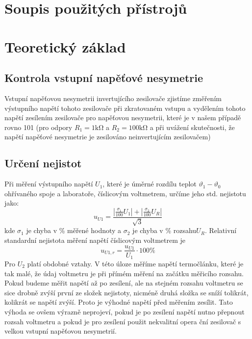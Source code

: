 \documentclass{article}
\begin{document}
\section{Soupis použitých přístrojů}



\section{Teoretický základ}
\subsection{Kontrola vstupní napěťové nesymetrie}
Vstupní napěťovou nesymetrii invertujícího zesilovače zjistíme změřením výstupního napětí tohoto zesilovače při zkratovaném vstupu a vydělením tohoto napětí zesílením zesilovače pro napěťovou nesymetrii, které je v našem případě rovno 101 (pro odpory $R_1 = 1 \si{\kilo\ohm}$ a $R_2 = 100 \si{\kilo\ohm}$ a při uvážení skutečnosti, že napětí napěťové nesymetrie je zesilováno neinvertujícím zesilovačem)

\subsection{Určení nejistot}
Při měření výstupního napětí $U_1$, které je úměrné rozdílu teplot $\vartheta_1 - \vartheta_0$ ohřívaného spoje a laboratoře, číslicovým voltmetrem, určíme jeho std. nejistotu jako:
\begin{equation}
    u_{U1}=\frac{	| \frac{\sigma_1}{100}U_1 | + | \frac{\sigma_2}{100}U_R | }{\sqrt{3}}
\end{equation}
kde $\sigma_1$ je chyba v \% měřené hodnoty a $\sigma_2$ je chyba v \% rozsahu$U_R$. Relativní standardní nejistota měření napětí číslicovým voltmetrem je
\begin{equation}
    u_{U1,r} = \frac{u_{U1}}{U_1} \cdot 100\%
\end{equation}
Pro $U_2$ platí obdobné vztahy. V této úloze měříme napětí termočlánku, které je tak malé, že údaj voltmetru je při přímém měření na začátku měřicího rozsahu. Pokud budeme měřit napětí až po zesílení, ale na stejném rozsahu voltmetru se sice drobně zvýší první ze složek nejistoty, nicméně druhá složka se sníží tolikrát, kolikrát se napětí zvýší. Proto je výhodné napětí před měřením zesílit. Tato výhoda se ovšem výrazně neprojeví, pokud je po zesílení napětí nutno přepnout rozsah voltmetru a pokud je pro zesílení použit nekvalitní opera ční zesilovač s velkou vstupní napěťovou nesymetrií.
\end{document}
